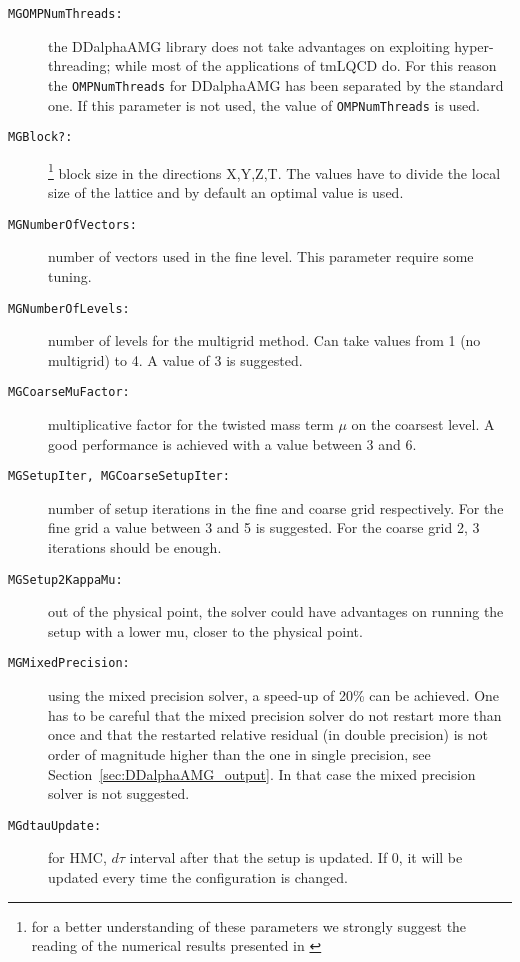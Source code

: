 \begin{description}
	\item[\texttt{MGOMPNumThreads:}] the DDalphaAMG library does not take advantages on exploiting hyper-threading; while most of the applications of tmLQCD do. For this reason the \texttt{OMPNumThreads} for DDalphaAMG has been separated by the standard one. If this parameter is not used, the value of \texttt{OMPNumThreads} is used.
	\item[\texttt{MGBlock?:}]\footnote{\label{fn:Alexandrou:2016} for a better understanding of these parameters we strongly suggest the reading of the numerical results presented in \cite{Alexandrou:2016}} block size in the directions X,Y,Z,T. The values have to divide the local size of the lattice and by default an optimal value is used.
	\item[\texttt{MGNumberOfVectors:}] number of vectors used in the fine level. This parameter require some tuning.
	\item[\texttt{MGNumberOfLevels:}] number of levels for the multigrid method. Can take values from 1 (no multigrid) to 4. A value of 3 is suggested.
	\item[\texttt{MGCoarseMuFactor:}] multiplicative factor for the twisted mass term $\mu$ on the coarsest level. A good performance is achieved with a value between 3 and 6.
	\item[\texttt{MGSetupIter, MGCoarseSetupIter:}] number of setup iterations in the fine and coarse grid respectively. For the fine grid a value between 3 and 5 is suggested. For the coarse grid 2, 3 iterations should be enough. 
	\item[\texttt{MGSetup2KappaMu:}] out of the physical point, the
          solver could have advantages on running the setup with a
          lower mu, closer to the physical point.
	\item[\texttt{MGMixedPrecision:}] using the mixed precision solver,
          a speed-up of 20\% can be achieved. One has to be careful
          that the mixed precision solver do not restart more than
          once and that the restarted relative residual (in double
          precision) is not order of magnitude higher than the one in single
          precision, see Section~\ref{sec:DDalphaAMG_output}. In that
          case the mixed precision solver is not suggested.
	\item[\texttt{MGdtauUpdate:}] for HMC, $d\tau$ interval after that the setup is updated. If 0, it will be updated every time the configuration is changed.

\end{description}
